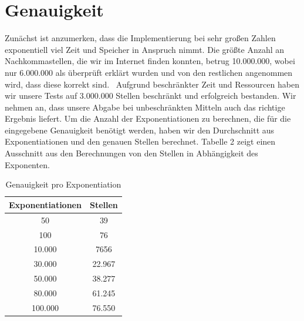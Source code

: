 \documentclass[course=erap]{aspdoc}
\begin{document}
    \section{Genauigkeit}\label{Genauigkeit}
    Zunächst ist anzumerken, dass die Implementierung bei sehr großen Zahlen exponentiell viel Zeit und Speicher in Anspruch nimmt. Die größte Anzahl an Nachkommastellen, die wir im Internet finden konnten, betrug 10.000.000, wobei nur 6.000.000 als überprüft erklärt wurden und von den restlichen angenommen wird, dass diese korrekt sind.~\cite{root} Aufgrund beschränkter Zeit und Ressourcen haben wir unsere Tests auf 3.000.000 Stellen beschränkt und erfolgreich bestanden. Wir nehmen an, dass unsere Abgabe bei unbeschränkten Mitteln auch das richtige Ergebnis liefert.
    Um die Anzahl der Exponentiationen zu berechnen, die für die eingegebene Genauigkeit benötigt werden, haben wir den Durchschnitt aus Exponentiationen und den genauen Stellen berechnet. Tabelle 2 zeigt einen Ausschnitt aus den Berechnungen von den Stellen in Abhängigkeit des Exponenten.
    \begin{center}
        \begin{table}[ht]
            \centering
            \begin{tabular}{c|c}
                Exponentiationen & Stellen \\
                \hline
                50 & 39 \\
                \hline
                100 & 76 \\
                \hline
                10.000 &	7656 \\

                \hline
                30.000 &	22.967 \\
                \hline
                50.000 &	38.277 \\
                \hline
                80.000 &	61.245 \\
                \hline
                100.000 & 76.550 \\
                \hline
            \end{tabular}
            \caption{Genauigkeit pro Exponentiation}
        \end{table}
    \end{center}
\end{document}
